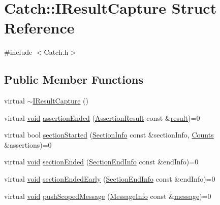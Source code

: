 \hypertarget{struct_catch_1_1_i_result_capture}{}\section{Catch\+:\+:I\+Result\+Capture Struct Reference}
\label{struct_catch_1_1_i_result_capture}


{\ttfamily \#include $<$Catch.\+h$>$}

\subsection*{Public Member Functions}
\begin{DoxyCompactItemize}
\item 
virtual \hyperlink{struct_catch_1_1_i_result_capture_a3bd16719d6772b7470887fc36c6d0808}{$\sim$\+I\+Result\+Capture} ()
\item 
virtual \hyperlink{_s_d_l__opengles2__gl2ext_8h_ae5d8fa23ad07c48bb609509eae494c95}{void} \hyperlink{struct_catch_1_1_i_result_capture_ae45e08bccc5fb434656d4f2e44742223}{assertion\+Ended} (\hyperlink{class_catch_1_1_assertion_result}{Assertion\+Result} const \&\hyperlink{_s_d_l__opengl__glext_8h_a321ff419cd5252e54cf95e64dc6687ee}{result})=0
\item 
virtual bool \hyperlink{struct_catch_1_1_i_result_capture_a5b76ed52badcb64cf374202e12b81a03}{section\+Started} (\hyperlink{struct_catch_1_1_section_info}{Section\+Info} const \&section\+Info, \hyperlink{struct_catch_1_1_counts}{Counts} \&assertions)=0
\item 
virtual \hyperlink{_s_d_l__opengles2__gl2ext_8h_ae5d8fa23ad07c48bb609509eae494c95}{void} \hyperlink{struct_catch_1_1_i_result_capture_a4e152bc43dc0933684e31fa67a58195d}{section\+Ended} (\hyperlink{struct_catch_1_1_section_end_info}{Section\+End\+Info} const \&end\+Info)=0
\item 
virtual \hyperlink{_s_d_l__opengles2__gl2ext_8h_ae5d8fa23ad07c48bb609509eae494c95}{void} \hyperlink{struct_catch_1_1_i_result_capture_afcc71eef8ca821ae132cced4a2be6988}{section\+Ended\+Early} (\hyperlink{struct_catch_1_1_section_end_info}{Section\+End\+Info} const \&end\+Info)=0
\item 
virtual \hyperlink{_s_d_l__opengles2__gl2ext_8h_ae5d8fa23ad07c48bb609509eae494c95}{void} \hyperlink{struct_catch_1_1_i_result_capture_a91d154c1e087e383dcde5aad95cb6a05}{push\+Scoped\+Message} (\hyperlink{struct_catch_1_1_message_info}{Message\+Info} const \&\hyperlink{_s_d_l__opengl__glext_8h_a7b6161cffb9b8aee272b3b916183d28c}{message})=0

\end{DoxyCompactItemize}
